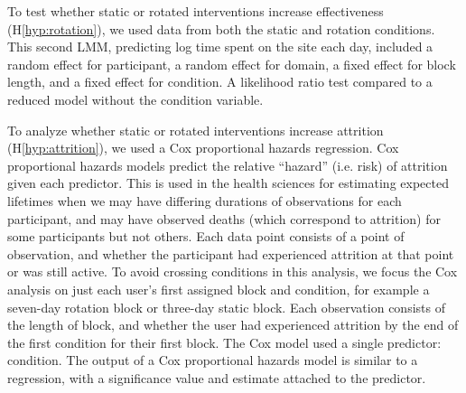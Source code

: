 To test whether static or rotated interventions increase effectiveness (H\ref*{hyp:rotation}), we used data from both the static and rotation conditions. This second LMM, predicting log time spent on the site each day, included a random effect for participant, a random effect for domain, a fixed effect for block length, and a fixed effect for condition. A likelihood ratio test compared to a reduced model without the condition variable. 

To analyze whether static or rotated interventions increase attrition (H\ref*{hyp:attrition}), we %
used a Cox proportional hazards regression. Cox proportional hazards models predict the relative ``hazard'' (i.e. risk) of attrition given each predictor. This is used in the health sciences for estimating expected lifetimes when we may have differing durations of observations for each participant, and may have observed deaths (which correspond to attrition) for some participants but not others. Each data point consists of a point of observation, and whether the participant had experienced attrition at that point or was still active. To avoid crossing conditions in this analysis, we focus the Cox analysis on just each user's first assigned block and condition, for example a seven-day rotation block or three-day static block. Each observation consists of the length of block, and whether the user had experienced attrition by the end of the first condition for their first block. The Cox model used a single predictor: condition. The output of a Cox proportional hazards model is similar to a regression, with a significance value and estimate attached to the predictor.



